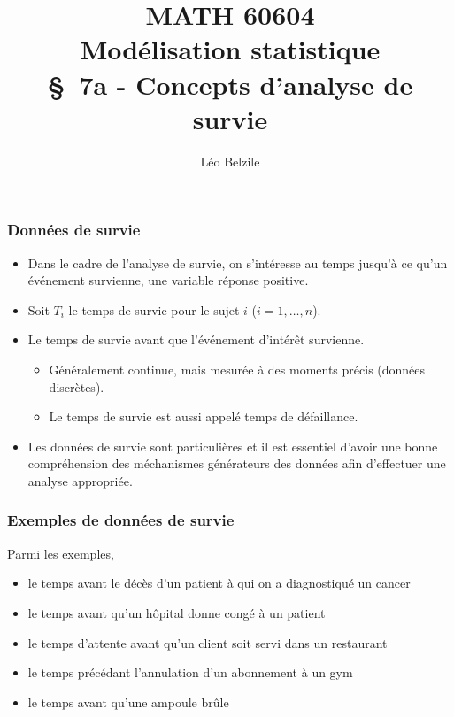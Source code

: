 \documentclass{beamer}
\title[\color{white}{MATH 60604 \S~7a - Concepts d'analyse de survie}]{\texorpdfstring{MATH 60604 \\Modélisation statistique \\ \S~7a - Concepts d'analyse de survie}{MATH 60604 \\ Modélisation statistique \\ \S~7a - Concepts d'analyse de survie}}
\author{Léo Belzile}
\institute{HEC Montréal\\
Département de sciences de la décision}
\date{}
\begin{document}
\frame{\titlepage}
\begin{frame}
\frametitle{Données de survie}
\begin{itemize}
\vp \vp
\item Dans le cadre de \alert{l'analyse de survie}, on s'intéresse au temps jusqu'à ce qu'un événement survienne, une variable réponse positive.
\item Soit $T_i$ le \alert{temps de survie} pour le sujet $i$ ($i=1, \ldots, n$). 
\item Le temps de survie avant que l'événement d'intérêt survienne. 
\begin{itemize}
\vp \vp
\item Généralement continue, mais mesurée à des moments précis (données discrètes).
\item Le temps de survie est aussi appelé \alert{temps de défaillance}.
\end{itemize}
\item Les données de survie sont particulières et il est essentiel d'avoir une bonne compréhension des méchanismes générateurs des données afin d'effectuer une analyse appropriée. 
\end{itemize}
\end{frame}
\begin{frame}
\frametitle{Exemples de données de survie}
Parmi les exemples, 
\begin{itemize}
\vp \vp
\item le temps avant le décès d'un patient à qui on a diagnostiqué un cancer 
\item le temps avant qu'un hôpital donne congé à un patient 
\item le temps d'attente avant qu'un client soit servi dans un restaurant
\item le temps précédant l'annulation d'un abonnement à un gym
\item le temps avant qu'une ampoule brûle
\end{itemize}
\end{frame}
\end{document}

